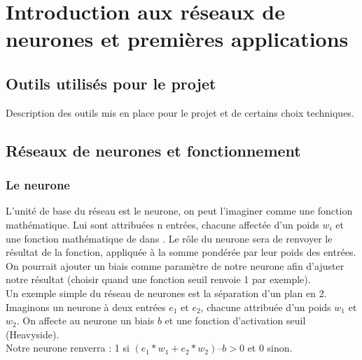 


\chapter{Introduction aux réseaux de neurones et premières applications}

\section{Outils utilisés pour le projet}

Description des outils mis en place pour le projet et de certains choix techniques.

\section{Réseaux de neurones et fonctionnement}

\subsection{Le neurone} %
\label{sub:le_neurone}
L’unité de base du réseau est le neurone, on peut l’imaginer comme une fonction mathématique. Lui sont attribuées n entrées, chacune affectée d’un poids $w_i$ et une fonction mathématique de \bbbR dans \bbbR. Le rôle du neurone sera de renvoyer le résultat de la fonction, appliquée à la somme pondérée par leur poids des entrées. On pourrait ajouter un biais comme paramètre de notre neurone afin d’ajuster notre résultat (choisir quand une fonction seuil renvoie 1 par exemple).\\

Un exemple simple du réseau de neurones est la séparation d’un plan en 2.\\
Imaginons un neurone à deux entrées $e_1$ et $e_2$, chacune attribuée d’un poids $w_1$ et $w_2$. On affecte au neurone un biais $b$ et une fonction d’activation seuil (Heavyside).\\
Notre neurone renverra : 1 si $(e_1*w_1+e_2*w_2) – b >0$ et 0 sinon.\\

